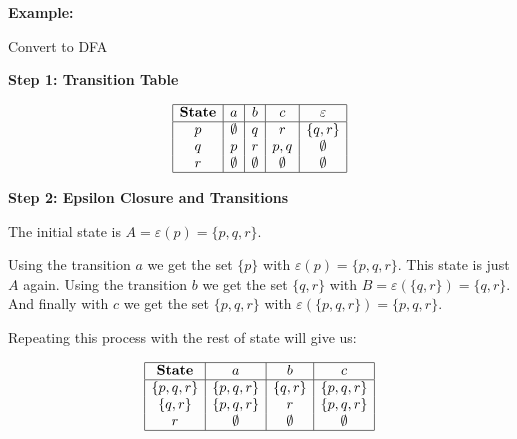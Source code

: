 \textbf{Example:} 

Convert to DFA

\begin{figure}[H]
\centering
{}
\end{figure}

\textbf{Step 1: Transition Table}

\[
    \begin{array}{|c|c|c|c|c|}
    \hline
    \textbf{State} & a & b & c & \varepsilon \\
    \hline
    p & \emptyset & q & r & \{q, r\} \\
    q & p & r & p,q & \emptyset \\
    r & \emptyset & \emptyset & \emptyset & \emptyset \\
    \hline
    \end{array}
\]

\textbf{Step 2: Epsilon Closure and Transitions}

The initial state is \(A = \varepsilon(p) = \{p,q,r\}\).

Using the transition \(a\) we get the set \(\{p\}\) with \(\varepsilon(p) = \{p,q,r\}\). This state 
is just \(A\) again. Using the transition \(b\) we get the set \(\{q,r\}\) with \(B = \varepsilon(\{q,r\}) = \{q,r\}\).
And finally with \(c\) we get the set \(\{p, q, r\}\) with \(\varepsilon(\{p, q, r\}) = \{p,q, r\}\).
 
Repeating this process with the rest of state will give us: 

\[
    \begin{array}{|c|c|c|c|c|}
    \hline
    \textbf{State} & a & b & c \\
    \hline
    \{p,q,r\} & \{p,q,r\} & \{q,r\} & \{p,q,r\} \\
    \{q,r\}& \{p,q,r\} & r & \{p,q,r\} \\
     r       &  \emptyset  & \emptyset & \emptyset \\
    \hline
    \end{array}
\]


